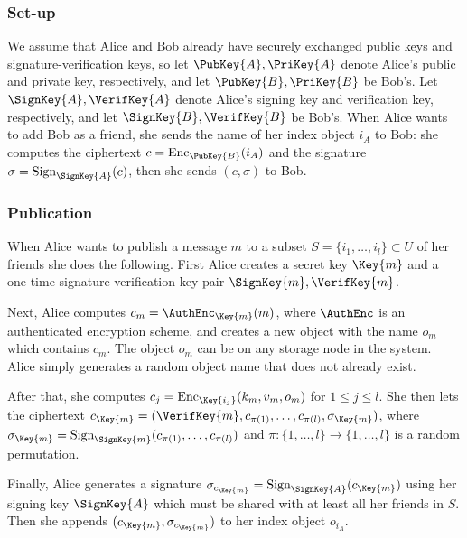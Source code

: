 \subsubsection{Set-up}

We assume that Alice and Bob already have securely exchanged public keys and 
signature-verification keys,
so let \(\PubKey{A}, \PriKey{A}\) denote Alice's public and private key, 
respectively, and let \(\PubKey{B}, \PriKey{B}\) be Bob's.
Let \(\SignKey{A}, \VerifKey{A}\) denote Alice's signing key and verification 
key, respectively, and let \(\SignKey{B}, \VerifKey{B}\) be Bob's.
When Alice wants to add Bob as a friend, she sends the name of her index object 
\(i_A\) to Bob:
she computes the ciphertext \(c = \Enc_{\PubKey{B}}( i_A )\) and the signature 
\(\sigma = \Sign_{\SignKey{A}}( c )\), then she sends \((c, \sigma)\) to Bob.

\subsubsection{Publication}

When Alice wants to publish a message \(m\) to a subset \(S = \{i_1, \ldots, 
  i_l\}\subset U\) of her friends she does the following.
First Alice creates a secret key \(\Key{m}\) and a one-time signature-verification key-pair \(\SignKey{m}, \VerifKey{m}\).

Next, Alice computes \(c_m = \AuthEnc_{\Key{m}}( m )\), where \(\AuthEnc\) is 
an authenticated encryption scheme, and creates a new object with the name 
\(o_m\) which contains \(c_m\).
The object \(o_m\) can be on any storage node in the system.
Alice simply generates a random object name that does not already exist.

After that, she computes \(c_j = \Enc_{\Key{i_j}}( k_m, v_m, o_m )\) for 
\(1\leq j\leq l\).
She then lets the ciphertext \(c_{\Key{m}} = (\VerifKey{m}, c_{\pi(1)}, \ldots, 
  c_{\pi(l)}, \sigma_{\Key{m}})\), where \(\sigma_{\Key{m}} 
  = \Sign_{\SignKey{m}}( c_{\pi(1)}, \ldots, c_{\pi(l)} )\) and \(\pi\colon 
  \{1,\ldots,l\}\to \{1,\ldots,l\}\) is a random permutation.

Finally, Alice generates a signature \(\sigma_{c_{\Key{m}}} 
  = \Sign_{\SignKey{A}}( c_{\Key{m}} )\) using her signing key \(\SignKey{A}\) 
which must be shared with at least all her friends in \(S\).
Then she appends \((c_{\Key{m}}, \sigma_{c_{\Key{m}}})\) to her index object 
\(o_{i_A}\).


